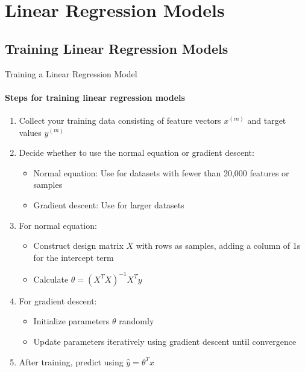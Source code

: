 
\section{Linear Regression Models}

\subsection{Training Linear Regression Models}

\begin{KR}{Training a Linear Regression Model}
\paragraph{Steps for training linear regression models}
\begin{enumerate}
    \item Collect your training data consisting of feature vectors $x^{(m)}$ and target values $y^{(m)}$
    \item Decide whether to use the normal equation or gradient descent:
    \begin{itemize}
        \item Normal equation: Use for datasets with fewer than 20,000 features or samples
        \item Gradient descent: Use for larger datasets
    \end{itemize}
    \item For normal equation:
    \begin{itemize}
        \item Construct design matrix $X$ with rows as samples, adding a column of 1s for the intercept term
        \item Calculate $\theta = (X^T X)^{-1}X^T y$
    \end{itemize}
    \item For gradient descent:
    \begin{itemize}
        \item Initialize parameters $\theta$ randomly
        \item Update parameters iteratively using gradient descent until convergence
    \end{itemize}
    \item After training, predict using $\hat{y} = \theta^T x$
\end{enumerate}
\end{KR}

